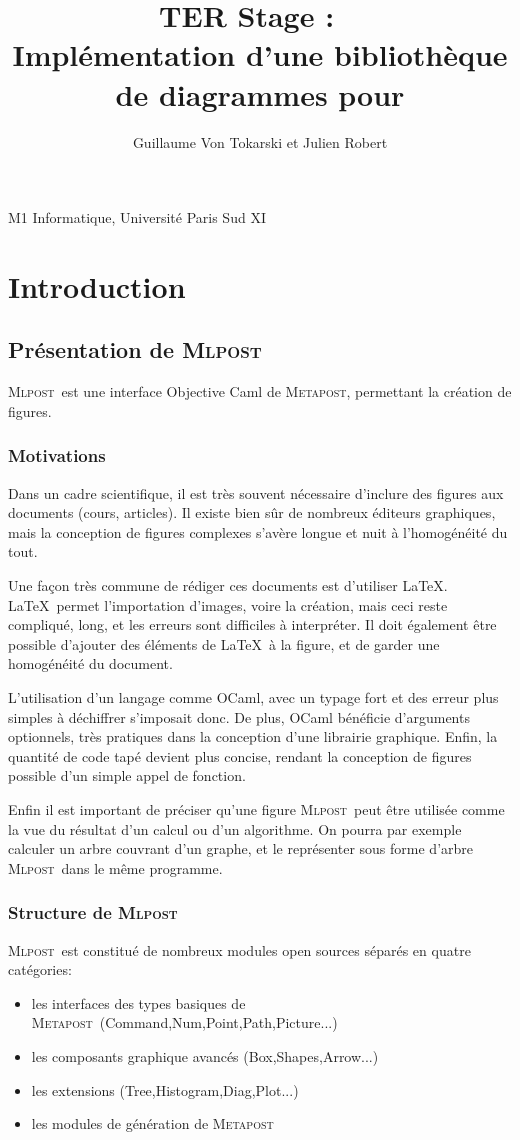 \documentclass[a4paper,12pt]{article}
\title{\huge{TER Stage : ~\\
  Implémentation d'une bibliothèque de diagrammes pour \mlpost}}
\author{ Guillaume Von Tokarski et Julien Robert}
\newcommand{\mlpost}{\textsc{Mlpost}}
\newcommand{\meta}{\textsc{Metapost}}
\begin{document}
\maketitle

\begin{center}M1 Informatique, Université Paris Sud XI\end{center}
\newpage
\tableofcontents
\newpage
\section{Introduction}

\subsection{Présentation de \mlpost}
\mlpost\ est une interface Objective Caml de \meta, permettant la création de figures. \cite{mlpost}

\subsubsection{Motivations}
Dans un cadre scientifique, il est très souvent nécessaire d'inclure des figures aux documents (cours, articles). Il existe bien sûr de nombreux éditeurs graphiques, mais la conception de figures complexes s'avère longue et nuit à l'homogénéité du tout. 
\bigskip 

Une façon très commune de rédiger ces documents est d'utiliser \LaTeX. \LaTeX\ permet l'importation d'images, voire la création, mais ceci reste compliqué, long, et les erreurs sont difficiles à interpréter. Il doit également être possible d'ajouter des éléments de \LaTeX\ à la figure, et de garder une homogénéité du document. 
\bigskip

L'utilisation d'un langage comme OCaml, avec un typage fort et des
erreur plus simples à déchiffrer s'imposait donc. De plus, OCaml
bénéficie d'arguments optionnels, très pratiques dans la conception
d'une librairie graphique. Enfin, la quantité de code tapé devient plus concise, rendant la conception de figures possible d'un simple appel de fonction.

Enfin il est important de préciser qu'une figure \mlpost\ peut être utilisée comme la vue du résultat d'un calcul ou d'un algorithme. On pourra par exemple calculer un arbre couvrant d'un graphe, et le représenter sous forme d'arbre \mlpost\ dans le même programme.

\subsubsection{Structure de \mlpost}
\mlpost\ est constitué de nombreux modules open sources séparés en quatre catégories:
\begin{itemize}
\item les interfaces des types basiques de \meta\ (Command,Num,Point,Path,Picture...)
\item les composants graphique avancés (Box,Shapes,Arrow...) 
\item les extensions (Tree,Histogram,Diag,Plot...)
\item les modules de génération de \meta
\end{itemize}
\end{document}
